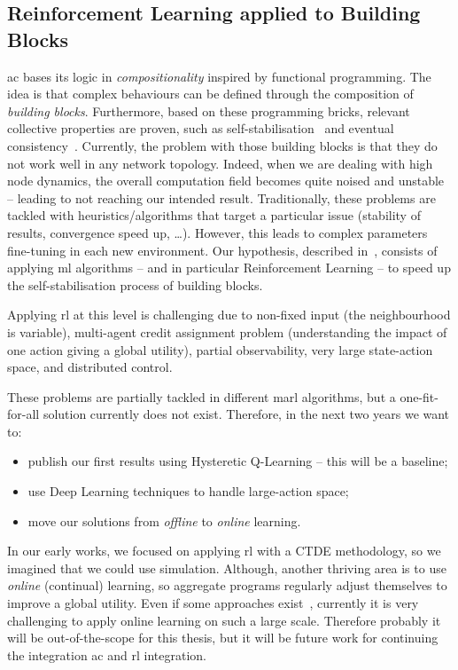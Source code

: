 \documentclass[11pt]{article}
\begin{document}
\subsection{Reinforcement Learning applied to Building Blocks}\label{rl-future}
\ac{ac} bases its logic in \textit{compositionality} inspired by functional programming. The idea is that complex behaviours can be defined through the composition of \emph{building blocks}. Furthermore, based on these programming bricks, relevant collective properties are proven, such as self-stabilisation~\cite{DBLP:journals/corr/abs-1711-08297} and eventual consistency~\cite{DBLP:conf/saso/BealVPD16}. 
%
Currently, the problem with those building blocks is that they do not work well in any network topology. Indeed, when we are dealing with high node dynamics, the overall computation field becomes quite noised and unstable -- leading to not reaching our intended result.
%
Traditionally, these problems are tackled with heuristics/algorithms that target a particular issue (stability of results, convergence speed up, \dots{}). However, this leads to complex parameters fine-tuning in each new environment.
%
Our hypothesis, described in~\cite{research}, consists of applying \ac{ml} algorithms -- and in particular Reinforcement Learning --
to speed up the self-stabilisation process of building blocks.

Applying \ac{rl} at this level is challenging due to non-fixed input (the neighbourhood is variable), multi-agent credit assignment problem (understanding the impact of one action giving a global utility), partial observability, very large state-action space, and distributed control.

These problems are partially tackled in different \ac{marl} algorithms, but a one-fit-for-all solution currently does not exist. Therefore, in the next two years we want to:
\begin{itemize}
	\item publish our first results using Hysteretic Q-Learning -- this will be a baseline;
	\item use Deep Learning techniques to handle large-action space;
	\item move our solutions from \emph{offline} to \emph{online} learning. 
\end{itemize}
In our early works, we focused on applying \ac{rl} with a CTDE methodology, so we imagined that we could use simulation.
Although, another thriving area is to use \emph{online} (continual) learning, so aggregate programs regularly adjust themselves to improve a global utility. Even if some approaches exist~\cite{DBLP:conf/icml/OmidshafieiPAHV17}, currently it is very challenging to apply online learning on such a large scale. Therefore probably it will be out-of-the-scope for this thesis, but it will be future work for continuing the integration \ac{ac} and \ac{rl} integration. 
\end{document}
